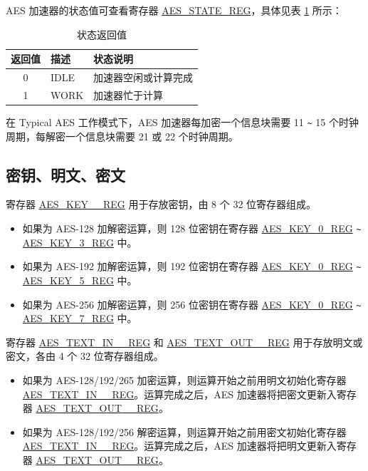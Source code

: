 \documentclass[main\_\_CN.tex]{subfiles}
\begin{document}
AES 加速器的状态值可查看寄存器 \hyperref[regdesc:AESSTATEREG]{AES\_STATE\_REG}，具体见表 \ref{table:AESStateValue-aes} 所示：

\begin{longtable}[c]{ |c | l | l | }
\caption{状态返回值}
\label{table:AESStateValue-aes}
\\\hline
\rowcolor{lightgray}
返回值 & 描述 &  状态说明 \\ \hline

    0                   & IDLE      &   加速器空闲或计算完成\\ \hline
    1                   & WORK      &   加速器忙于计算     \\ \hline
\end{longtable}

在 Typical AES 工作模式下，AES 加速器每加密一个信息块需要 11 \verb+~+ 15 个时钟周期，每解密一个信息块需要 21 或 22 个时钟周期。


\subsection{密钥、明文、密文}

寄存器 \hyperref[regdesc:AESKEYnREG]{AES\_KEY\_\_REG} 用于存放密钥，由 8 个 32 位寄存器组成。

\begin{itemize}
    \item 如果为 AES-128 加解密运算，则 128 位密钥在寄存器 \hyperref[regdesc:AESKEYnREG]{AES\_KEY\_0\_REG} \verb+~+ \hyperref[regdesc:AESKEYnREG]{AES\_KEY\_3\_REG} 中。
    \item 如果为 AES-192 加解密运算，则 192 位密钥在寄存器 \hyperref[regdesc:AESKEYnREG]{AES\_KEY\_0\_REG} \verb+~+ \hyperref[regdesc:AESKEYnREG]{AES\_KEY\_5\_REG} 中。
    \item 如果为 AES-256 加解密运算，则 256 位密钥在寄存器 \hyperref[regdesc:AESKEYnREG]{AES\_KEY\_0\_REG} \verb+~+ \hyperref[regdesc:AESKEYnREG]{AES\_KEY\_7\_REG} 中。
\end{itemize}

寄存器 \hyperref[regdesc:AESTEXTINnREG]{AES\_TEXT\_IN\_\_REG} 和 \hyperref[regdesc:AESTEXTOUTnREG]{AES\_TEXT\_OUT\_\_REG} 用于存放明文或密文，各由 4 个 32 位寄存器组成。

\begin{itemize}
    \item 如果为 AES-128/192/265 加密运算，则运算开始之前用明文初始化寄存器 \hyperref[regdesc:AESTEXTINnREG]{AES\_TEXT\_IN\_\_REG}。运算完成之后，AES 加速器将把密文更新入寄存器 \hyperref[regdesc:AESTEXTOUTnREG]{AES\_TEXT\_OUT\_\_REG}。
    \item 如果为 AES-128/192/256 解密运算，则运算开始之前用密文初始化寄存器 \hyperref[regdesc:AESTEXTINnREG]{AES\_TEXT\_IN\_\_REG}。运算完成之后，AES 加速器将把明文更新入寄存器 \hyperref[regdesc:AESTEXTOUTnREG]{AES\_TEXT\_OUT\_\_REG}。
\end{itemize}
\end{document}
